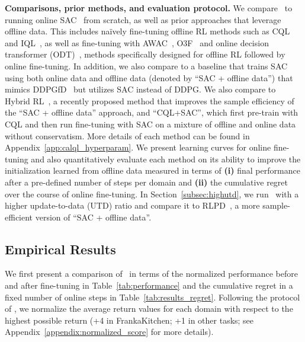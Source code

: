 \noindent \textbf{Comparisons, prior methods, and evaluation protocol.} We compare \methodname\ to running online SAC~\cite{haarnoja2018soft} from scratch, as well as prior approaches that leverage offline data. This includes na\"ively fine-tuning offline RL methods such as CQL~\cite{kumar2020conservative} and IQL~\cite{kostrikov2021offlineb}, as well as fine-tuning with AWAC~\citep{nair2020accelerating}, O3F~\cite{mark2022fine} and online decision transformer (ODT)~\citep{zheng2022online}, methods specifically designed for offline RL followed by online fine-tuning. In addition, we also compare to a baseline that trains SAC~\cite{haarnoja2018soft} using both online data and offline data (denoted by ``SAC + offline data'') that mimics DDPGfD~\citep{vecerik2017leveraging} but utilizes SAC instead of DDPG. We also compare to Hybrid RL~\citep{song2023hybrid}, a recently proposed method that improves the sample efficiency of the ``SAC + offline data'' approach, and ``CQL+SAC'', which first pre-train with CQL and then run fine-tuning with SAC on a mixture of offline and online data without conservatism. More details of each method can be found in Appendix~\ref{app:calql_hyperparam}.
We present learning curves for online fine-tuning and also quantitatively evaluate each method on its ability to improve the initialization learned from offline data measured in terms of \textbf{(i)} final performance after a pre-defined number of steps per domain and \textbf{(ii)} the cumulative regret over the course of online fine-tuning. In Section~\ref{subsec:highutd}, we run \methodname\ with a higher update-to-data (UTD) ratio and compare it to RLPD~\cite{rlpd}, a more sample-efficient version of ``SAC + offline data''.

\vspace{-0.2cm}
\subsection{Empirical Results} 
\vspace{-0.2cm}

We first present a comparison of \methodname\ in terms of the normalized performance before and after fine-tuning in Table~\ref{tab:performance} and the cumulative regret in a fixed number of online steps in Table~\ref{tab:results_regret}. Following the protocol of \cite{fu2020d4rl}, we normalize the average return values for each domain with respect to the highest possible return (+4 in FrankaKitchen; +1 in other tasks; see Appendix~\ref{appendix:normalized_score} for more details).  

